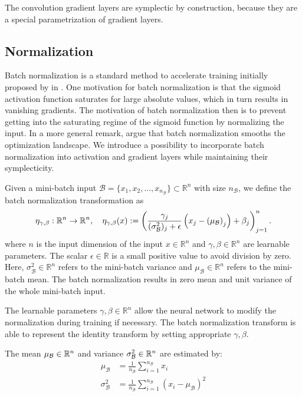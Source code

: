 \documentclass[twoside,a4paper]{article}
\begin{document}
The convolution gradient layers are symplectic by construction,
because they are a special parametrization of gradient layers.

\subsection{Normalization}

Batch normalization is a standard method to accelerate training initially proposed by
\citeauthor{batchnorm-ioffe15} in \cite{batchnorm-ioffe15}.
One motivation for batch normalization is that the sigmoid activation function saturates 
for large absolute values, which in turn results in vanishing gradients. The motivation of batch
normalization then is to prevent getting into the saturating regime of the sigmoid function
by normalizing the input. In a more general remark, \citet{Santurkar2018} argue that
batch normalization smooths the optimization landscape.
We introduce a possibility to incorporate batch normalization
into activation and gradient layers while maintaining their symplecticity.

Given a mini-batch input $\mathcal{B} = \{  x_1, x_2, \dots, x_{n_{\mathcal{B}}} \} \subset \mathbb{R}^{n}$ 
with size $n_{\mathcal{B}}$, we define the batch normalization transformation as
\begin{equation*}
	\eta_{\gamma, \beta} : \mathbb{R}^n \to \mathbb{R}^n,\quad
	\eta_{\gamma, \beta}(x) 
	:= \left( \frac{\gamma_j}{(\sigma^2_\mathcal{B})_j + \epsilon} 
	\left( x_j - \left( \mu_\mathcal{B} \right)_j \right) + \beta_j \right)_{j=1}^n
	.
\end{equation*}
where $n$ is the input dimension of the input $x \in \mathbb{R}^n$ and $\gamma, \beta \in \mathbb{R}^{n}$ 
are learnable parameters.
The scalar $\epsilon \in \mathbb{R}$ is a small positive value to avoid division by zero.
Here, $\sigma^2_\mathcal{B} \in \mathbb{R}^{n}$ refers to the mini-batch variance and
$\mu_\mathcal{B} \in \mathbb{R}^{n}$ refers to the mini-batch mean. The batch normalization results 
in zero mean and unit variance of the whole mini-batch input.

The learnable parameters $\gamma, \beta \in \mathbb{R}^{n}$ allow the neural network to modify
the normalization during training if necessary. The batch normalization transform is able to 
represent the identity transform by setting appropriate $\gamma, \beta$.

The mean $\mu_\mathcal{B} \in \mathbb{R}^n$ and variance $\sigma^2_\mathcal{B} \in \mathbb{R}^n$ are estimated by:
\begin{align*}
	\mu_\mathcal{B} &= \frac{1}{n_{\mathcal{B}}} \sum_{i=1}^{n_{\mathcal{B}}} x_i \\
	\sigma^2_\mathcal{B} &= \frac{1}{n_{\mathcal{B}}} 
	\sum_{i=1}^{n_{\mathcal{B}}} (x_i - \mu_\mathcal{B})^2
\end{align*}
\end{document}
